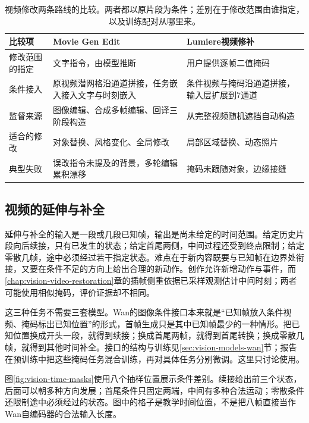 \begin{table}[tbp]
 \centering
 \small
 \begin{tabularx}{\linewidth}{@{}p{24mm}XX@{}}
  \toprule
  比较项 & Movie Gen Edit & Lumiere视频修补 \\
  \midrule
  修改范围的指定 & 文字指令，由模型推断 & 用户提供逐帧二值掩码 \\
  条件接入 & 原视频潜网格沿通道拼接，任务嵌入接入文字与时刻嵌入 & 条件视频与掩码沿通道拼接，输入层扩展到7通道 \\
  监督来源 & 图像编辑、合成多帧编辑、回译三阶段构造 & 从完整视频随机遮挡自动构造 \\
  适合的修改 & 对象替换、风格变化、全局修改 & 局部区域替换、动态照片 \\
  典型失败 & 误改指令未提及的背景，多轮编辑累积漂移 & 掩码未跟随对象，边缘接缝 \\
  \bottomrule
 \end{tabularx}
 \caption{视频修改两条路线的比较。两者都以原片段为条件；差别在于修改范围由谁指定，以及训练配对从哪里来。}
 \label{tab:vision-video-edit-compare}
\end{table}
\FloatBarrier

\subsection{视频的延伸与补全}
\label{sec:vision-multigen-extension}
\label{sec:vision-multigen-wan-extension}

延伸与补全的输入是一段或几段已知帧，输出是尚未给定的时间范围。给定历史片段向后续接，只有已发生的状态；给定首尾两侧，中间过程还受到终点限制；给定零散几帧，途中必须经过若干指定状态。难点在于新内容既要与已知帧在边界处衔接，又要在条件不足的方向上给出合理的新动作。创作允许新增动作与事件，而\ref{chap:vision-video-restoration}章的插帧侧重依据已采样观测估计中间时刻；两者可能使用相似掩码，评价证据却不相同。

这三种任务不需要三套模型。Wan的图像条件接口本来就是“已知帧放入条件视频、掩码标出已知位置”的形式，首帧生成只是其中已知帧最少的一种情形。把已知位置换成开头一段，就得到续接；换成首尾两帧，就得到首尾转换；换成零散几帧，就得到其他时间补全。接口的结构与训练见\ref{sec:vision-models-wan}节；报告在预训练中把这些掩码任务混合训练，再对具体任务分别微调。这里只讨论使用。

图\ref{fig:vision-time-masks}使用八个抽样位置展示条件差别。续接给出前三个状态，后面可以朝多种方向发展；首尾条件只固定两端，中间有多种合法运动；零散条件还限制途中必须经过的状态。图中的格子是教学时间位置，不是把八帧直接当作Wan自编码器的合法输入长度。

